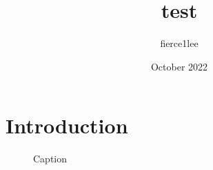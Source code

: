 \documentclass{article}
\title{test}
\author{fierce1lee }
\date{October 2022}
\begin{document}
\maketitle

\section{Introduction}

\begin{figure}
    \centering
    
    \caption{Caption}
    \label{fig:my_label}
\end{figure}
\end{document}

